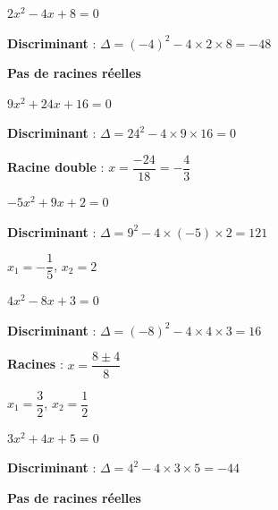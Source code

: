 \documentclass[11pt,a4paper]{article}  %
\begin{document}
\begin{enumMet}
	\item $2 x^2-4 x+8=0$
	\begin{corrBox}
		\begin{itemMet}
			\item \textbf{Discriminant} : \( \Delta = (-4)^2 - 4 \times 2 \times 8 = -48 \)
			\item \textbf{Pas de racines réelles}
		\end{itemMet}		
	\end{corrBox}
	\item $9 x^2+24 x+16=0$
	\begin{corrBox}
		\begin{itemMet}
			\item \textbf{Discriminant} : \( \Delta = 24^2 - 4 \times 9 \times 16 = 0 \)
			\item \textbf{Racine double} : \( x = \dfrac{-24}{18} = -\dfrac{4}{3} \)
		\end{itemMet}		
	\end{corrBox}
	\item $-5 x^2+9 x+2=0$
	\begin{corrBox}
		\begin{itemMet}
			\item \textbf{Discriminant} : \( \Delta = 9^2 - 4 \times (-5) \times 2 = 121 \)
			\item \( x_1 = -\dfrac{1}{5} \), \( x_2 = 2 \)
		\end{itemMet}		
	\end{corrBox}
	\item $4 x^2-8 x+3=0$
	\begin{corrBox}
		\begin{itemMet}
			\item \textbf{Discriminant} : \( \Delta = (-8)^2 - 4 \times 4 \times 3 = 16 \)
			\item \textbf{Racines} : \( x = \dfrac{8 \pm 4}{8} \)
			\item \( x_1 = \dfrac{3}{2} \), \( x_2 = \dfrac{1}{2} \)
		\end{itemMet}
	\end{corrBox}
	\item $3 x^2+4 x+5=0$
	\begin{corrBox}
		\begin{itemMet}
			\item \textbf{Discriminant} : \( \Delta = 4^2 - 4 \times 3 \times 5 = -44 \)
			\item \textbf{Pas de racines réelles}
		\end{itemMet}		
	\end{corrBox}

\end{enumMet}
\end{document}
